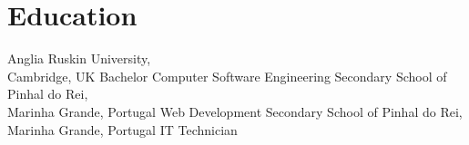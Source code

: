 \section[\faMortarBoard]{Education}
    {Anglia Ruskin University,\\ Cambridge, UK}
    {Bachelor Computer Software Engineering}
    {}
    {Secondary School of Pinhal do Rei,\\ Marinha Grande, Portugal}
    {Web Development}
    {}
    {Secondary School of Pinhal do Rei,\\ Marinha Grande, Portugal}
    {IT Technician}
    {}

